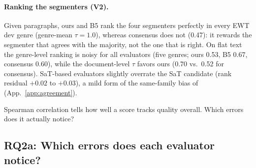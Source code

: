 \paragraph{Ranking the segmenters (V2).} Given paragraphs, ours and B5 rank the four segmenters perfectly in every EWT dev
genre (genre-mean $\tau = 1.0$), whereas consensus does not (0.47): it rewards the segmenter that agrees with the
majority, not the one that is right. On flat text the genre-level ranking is noisy for all evaluators (five genres;
ours 0.53, B5 0.67, consensus 0.60), while the document-level $\tau$ favors ours (0.70 vs.\ 0.52 for consensus).
SaT-based evaluators slightly overrate the SaT candidate (rank residual $+0.02$ to $+0.03$), a mild form of the
same-family bias of \citet{deutsch-etal-2022-limitations} (App.~\ref{app:agreement}).

Spearman correlation tells how well a score tracks quality overall. Which errors does it actually notice?

\subsection{RQ2a: Which errors does each evaluator notice?}
\label{sec:rq2a}

